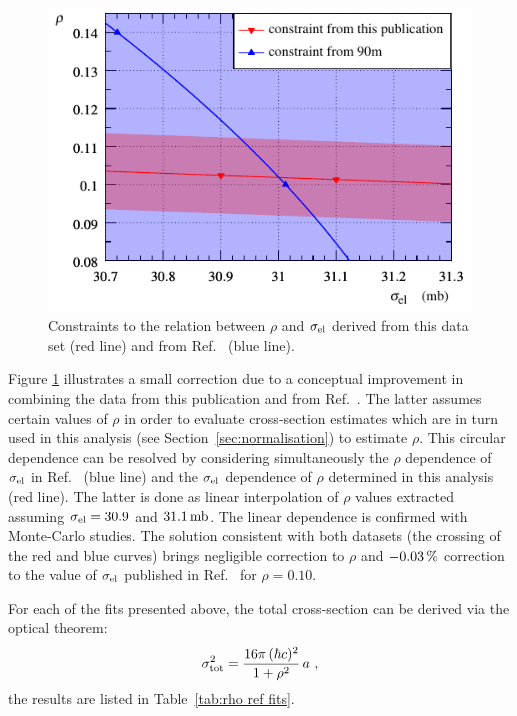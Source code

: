 \begin{figure}
\begin{center}
\includegraphics{fig/si_el_rho_solution.pdf}
\caption{%
Constraints to the relation between $\rho$ and $\sigma_{\rm el}$ derived from this data set (red line) and from Ref.~\cite{totem-13tev-90m} (blue line).
}
\label{fig:si_el rho sol}
\end{center}
\vskip-5mm
\end{figure}

Figure \ref{fig:si_el rho sol} illustrates a small correction due to a conceptual improvement in combining the data from this publication and from Ref.~\cite{totem-13tev-90m}. The latter assumes certain values of $\rho$ in order to evaluate cross-section estimates which are in turn used in this analysis (see Section~\ref{sec:normalisation}) to estimate $\rho$. This circular dependence can be resolved by considering simultaneously the $\rho$ dependence of $\sigma_{\rm el}$ in Ref.~\cite{totem-13tev-90m} (blue line) and the $\sigma_{\rm el}$ dependence of $\rho$ determined in this analysis (red line). The latter is done as linear interpolation of $\rho$ values extracted assuming $\sigma_{\rm el} = 30.9$ and $31.1\,{\rm mb}$. The linear dependence is confirmed with Monte-Carlo studies. The solution consistent with both datasets (the crossing of the red and blue curves) brings negligible correction to $\rho$ and $-0.03\,{\rm \%}$ correction to the value of $\sigma_{\rm el}$ published in Ref.~\cite{totem-13tev-90m} for $\rho=0.10$.


For each of the fits presented above, the total cross-section can be derived via the optical theorem:
\begin{equation}
\label{eq:si tot}
\sigma_{\rm tot}^2 = {16\pi\, (\hbar c)^2\over 1 + \rho^2}\, a\ ,
\end{equation}
the results are listed in Table~\ref{tab:rho ref fits}.



